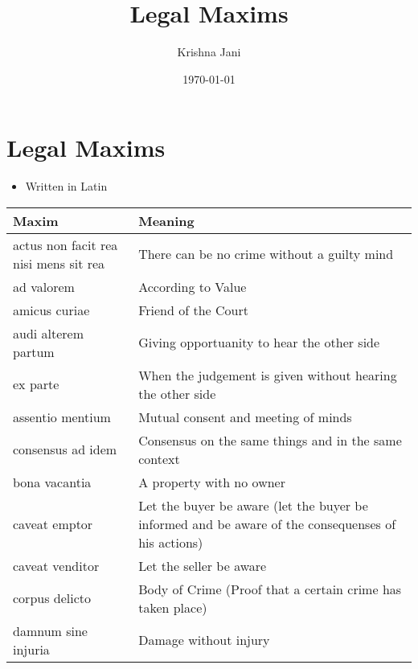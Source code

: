 \documentclass[11pt]{article}
\author{Krishna Jani}
\date{\today}
\title{Legal Maxims}
\begin{document}
\maketitle
\tableofcontents


\section{Legal Maxims}
\label{sec:org36cf100}
\begin{itemize}
\item Written in Latin
\end{itemize}

\begin{center}
\begin{tabular}{ll}
Maxim & Meaning\\
\hline
actus non facit rea nisi mens sit rea & There can be no crime without a guilty mind\\
ad valorem & According to Value\\
amicus curiae & Friend of the Court\\
audi alterem partum & Giving opportuanity to hear the other side\\
ex parte & When the judgement is given without hearing the other side\\
assentio mentium & Mutual consent and meeting of minds\\
consensus ad idem & Consensus on the same things and in the same context\\
bona vacantia & A property with no owner\\
caveat emptor & Let the buyer be aware (let the buyer be informed and be aware of the consequenses of his actions)\\
caveat venditor & Let the seller be aware\\
corpus delicto & Body of Crime (Proof that a certain crime has taken place)\\
damnum sine injuria & Damage without injury\\
\end{tabular}
\end{center}
\end{document}
